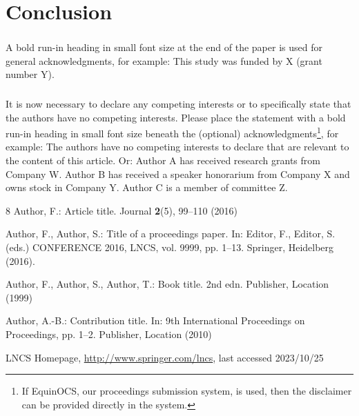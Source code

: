 \documentclass[runningheads]{llncs}
\begin{document}
\section{Conclusion}
\begin{credits}
\subsubsection{\ackname} A bold run-in heading in small font size at the end of the paper is
used for general acknowledgments, for example: This study was funded
by X (grant number Y).

\subsubsection{\discintname}
It is now necessary to declare any competing interests or to specifically
state that the authors have no competing interests. Please place the
statement with a bold run-in heading in small font size beneath the
(optional) acknowledgments\footnote{If EquinOCS, our proceedings submission
system, is used, then the disclaimer can be provided directly in the system.},
for example: The authors have no competing interests to declare that are
relevant to the content of this article. Or: Author A has received research
grants from Company W. Author B has received a speaker honorarium from
Company X and owns stock in Company Y. Author C is a member of committee Z.
\end{credits}
%
%
%
% 
% 
%
\begin{thebibliography}{8}
Author, F.: Article title. Journal \textbf{2}(5), 99--110 (2016)

Author, F., Author, S.: Title of a proceedings paper. In: Editor,
F., Editor, S. (eds.) CONFERENCE 2016, LNCS, vol. 9999, pp. 1--13.
Springer, Heidelberg (2016). 

Author, F., Author, S., Author, T.: Book title. 2nd edn. Publisher,
Location (1999)

Author, A.-B.: Contribution title. In: 9th International Proceedings
on Proceedings, pp. 1--2. Publisher, Location (2010)

LNCS Homepage, \url{http://www.springer.com/lncs}, last accessed 2023/10/25
\end{thebibliography}
\end{document}

